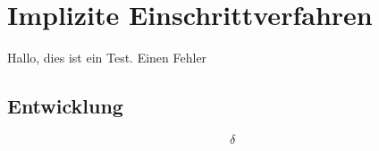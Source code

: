 \chapter{Implizite Einschrittverfahren}
Hallo, dies ist ein Test. Einen Fehler 
\section{Entwicklung}

\begin{equation}
	\delta 
\end{equation}


